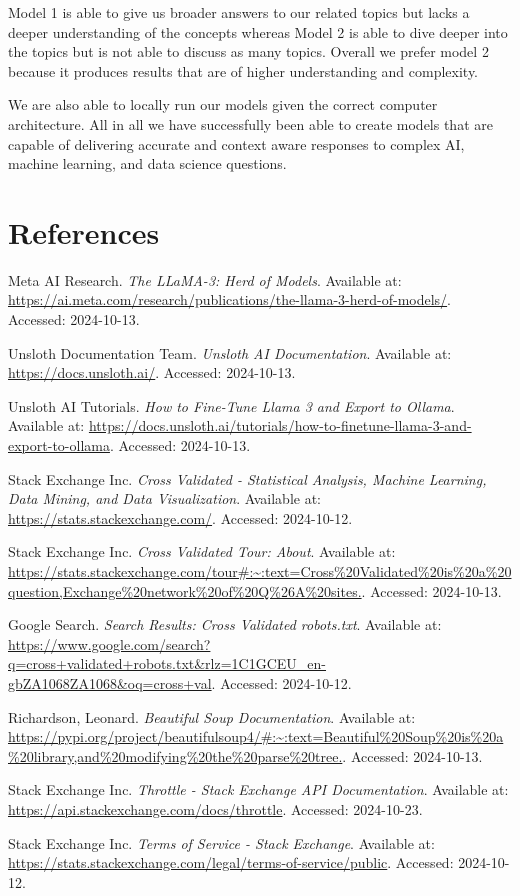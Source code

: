 \documentclass[10pt]{article}
\begin{document}
Model 1 is able to give us broader answers to our related topics but lacks a
deeper understanding of the concepts whereas Model 2 is able to dive deeper
into the topics but is not able to discuss as many topics. 
Overall we prefer model 2 because it produces results that are
of higher understanding and complexity.

We are also able to locally run our models given the correct computer architecture. 
All in all we have successfully been able to create models that are capable of delivering
accurate and context aware responses to complex AI, machine learning, and data science questions.

\section{References}
\begin{thebibliography}{9}

Meta AI Research. \textit{The LLaMA-3: Herd of Models}. Available at: \url{https://ai.meta.com/research/publications/the-llama-3-herd-of-models/}. Accessed: 2024-10-13.

Unsloth Documentation Team. \textit{Unsloth AI Documentation}. Available at: \url{https://docs.unsloth.ai/}. Accessed: 2024-10-13.

Unsloth AI Tutorials. \textit{How to Fine-Tune Llama 3 and Export to Ollama}. Available at: \url{https://docs.unsloth.ai/tutorials/how-to-finetune-llama-3-and-export-to-ollama}. Accessed: 2024-10-13.

Stack Exchange Inc. \textit{Cross Validated - Statistical Analysis, Machine Learning, Data Mining, and Data Visualization}. Available at: \url{https://stats.stackexchange.com/}. Accessed: 2024-10-12.

Stack Exchange Inc. \textit{Cross Validated Tour: About}. Available at: \url{https://stats.stackexchange.com/tour#:~:text=Cross%20Validated%20is%20a%20question,Exchange%20network%20of%20Q\%26A\%20sites.}. Accessed: 2024-10-13.

Google Search. \textit{Search Results: Cross Validated robots.txt}. Available at: \url{https://www.google.com/search?q=cross+validated+robots.txt&rlz=1C1GCEU_en-gbZA1068ZA1068&oq=cross+val}. Accessed: 2024-10-12.

Richardson, Leonard. \textit{Beautiful Soup Documentation}. Available at: \url{https://pypi.org/project/beautifulsoup4/#:~:text=Beautiful%20Soup%20is%20a%20library,and%20modifying%20the%20parse%20tree.}. Accessed: 2024-10-13.

Stack Exchange Inc. \textit{Throttle - Stack Exchange API Documentation}. Available at: \url{https://api.stackexchange.com/docs/throttle}. Accessed: 2024-10-23.

Stack Exchange Inc. \textit{Terms of Service - Stack Exchange}. Available at: \url{https://stats.stackexchange.com/legal/terms-of-service/public}. Accessed: 2024-10-12.

\end{thebibliography}
\end{document}
